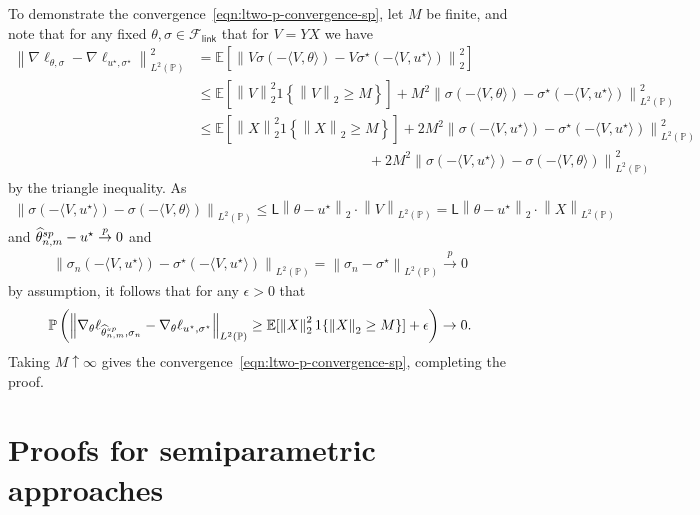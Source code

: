 \documentclass[11pt]{article}
\newcommand{\Ep}{\mathbb{E}}
\newcommand{\E}{\mathbb{E}}
\newcommand{\Prb}{\mathbb{P}}
\renewcommand{\P}{\mathbb{P}}
\newcommand{\brk}[1]{\left[{#1}\right]} %
\newcommand{\norm}[1]{\left\|{#1}\right\|} %
\newcommand{\what}[1]{\widehat{#1}}
\newcommand{\sem}{^{\textup{sp}}}
\newcommand{\Flink}{\mathcal{F}_{\mathsf{link}}}
\newcommand{\lipconst}{\mathsf{L}}
\newcommand{\loss}{\ell}
\newcommand{\ltwo}[1]{\norm{#1}_2} %
\newcommand{\<}{\langle} %
\renewcommand{\>}{\rangle}
\newcommand{\indic}[1]{1\!\left\{{#1}\right\}}
\newcommand{\cp}{\stackrel{p}{\rightarrow}}
\newcommand{\LtwoPbold}[1]{\norm{#1}_{L^2(\Prb)}}
\newcommand{\opt}{^\star}
\newcommand{\spe}{\what{\theta}\sem_{n,m}} %
\newtheorem{lemma}[claim]{Lemma}
\begin{document}
To demonstrate the convergence~\eqref{eqn:ltwo-p-convergence-sp}, let $M$ be
finite, and note that for any fixed $\theta, \sigma \in \Flink$ that for $V
= YX$ we have
\begin{align*}
	\LtwoPbold{\nabla \loss_{\theta, \sigma}
		- \nabla \loss_{u\opt, \sigma\opt}}^2
	& = \Ep \brk{\ltwo{V\sigma(-\<V, \theta\>) -
			V\sigma\opt(-\<V,  u\opt\>)}^2} \\
	& \leq \Ep \brk{\ltwo{V}^2 \indic{\ltwo{V} \geq M}}
	+ M^2 \LtwoPbold{\sigma(-\<V, \theta\>) - \sigma\opt(-\<V, u\opt\>)}^2 \\
	& \leq \Ep \brk{\ltwo{X}^2 \indic{\ltwo{X} \geq M}}
	+ 2M^2 \LtwoPbold{\sigma(-\<V, u\opt\>) - \sigma\opt(-\<V, u\opt\>)}^2 \\
	& \qquad\qquad\qquad\qquad\qquad\qquad ~
	+ 2M^2 \LtwoPbold{\sigma(-\<V, u\opt\>) - \sigma(-\<V, \theta\>)}^2
\end{align*}
by the triangle inequality.
As 
\begin{align*}
	\LtwoPbold{\sigma(-\<V, u\opt\>) - \sigma(-\<V, \theta\>)}
	\leq \lipconst \ltwo{\theta - u\opt} \cdot \LtwoPbold{V}
	= \lipconst \ltwo{\theta - u\opt} \cdot \LtwoPbold{X}
\end{align*}
and $\spe - u\opt \cp 0$ and
\begin{align*}
	\LtwoPbold{\sigma_n(-\<V, u\opt\>) - \sigma\opt(-\<V, u\opt\>)}
	= \LtwoPbold{\sigma_n - \sigma\opt} \cp 0
\end{align*}
by assumption,
it follows that for any $\epsilon > 0$ that
\begin{align*}
	\P\left(\LtwoPbold{\nabla_{\theta} \loss_{\spe, \sigma_n}
		- \nabla_{\theta} \loss_{u\opt, \sigma\opt}}
	\ge \E[\ltwo{X}^2 \indic{\ltwo{X} \geq M}] + \epsilon
	\right) \to 0.
\end{align*}
Taking $M \uparrow \infty$ gives the
convergence~\eqref{eqn:ltwo-p-convergence-sp}, completing the proof.


%
%


\section{Proofs for semiparametric approaches}
\end{document}

